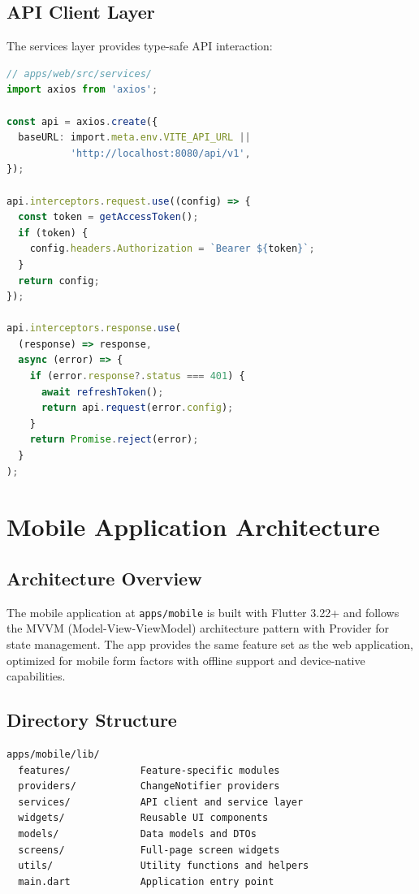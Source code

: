 \subsection{API Client Layer}

The services layer provides type-safe API interaction:

\begin{lstlisting}[language=TypeScript, caption=API Client Structure]
// apps/web/src/services/
import axios from 'axios';

const api = axios.create({
  baseURL: import.meta.env.VITE_API_URL ||
           'http://localhost:8080/api/v1',
});

api.interceptors.request.use((config) => {
  const token = getAccessToken();
  if (token) {
    config.headers.Authorization = `Bearer ${token}`;
  }
  return config;
});

api.interceptors.response.use(
  (response) => response,
  async (error) => {
    if (error.response?.status === 401) {
      await refreshToken();
      return api.request(error.config);
    }
    return Promise.reject(error);
  }
);
\end{lstlisting}

\clearpage

\section{Mobile Application Architecture}

\subsection{Architecture Overview}

The mobile application at \texttt{apps/mobile} is built with Flutter 3.22+ and follows the MVVM (Model-View-ViewModel) architecture pattern with Provider for state management. The app provides the same feature set as the web application, optimized for mobile form factors with offline support and device-native capabilities.

\subsection{Directory Structure}

\begin{verbatim}
apps/mobile/lib/
  features/            Feature-specific modules
  providers/           ChangeNotifier providers
  services/            API client and service layer
  widgets/             Reusable UI components
  models/              Data models and DTOs
  screens/             Full-page screen widgets
  utils/               Utility functions and helpers
  main.dart            Application entry point
\end{verbatim}

